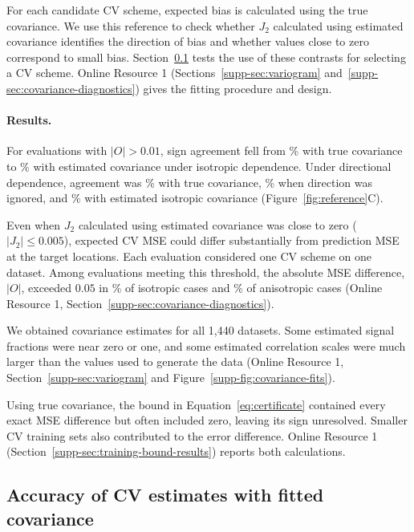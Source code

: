For each candidate CV scheme, expected bias is calculated using the true covariance. We use this reference to check whether $J_2$ calculated using estimated covariance identifies the direction of bias and whether values close to zero correspond to small bias. Section~\ref{sec:sim-refitting} tests the use of these contrasts for selecting a CV scheme. Online Resource 1 (Sections~\ref*{supp-sec:variogram} and~\ref*{supp-sec:covariance-diagnostics}) gives the fitting procedure and design.

\paragraph{Results.}
For evaluations with $|O|>0.01$, sign agreement fell from \SensIsoTrue\% with true covariance to \SensIsoEst\% with estimated covariance under isotropic dependence. Under directional dependence, agreement was \SensAnisoTrue\% with true covariance, \SensAnisoNominal\% when direction was ignored, and \SensAnisoEst\% with estimated isotropic covariance (Figure~\ref{fig:reference}C).

Even when $J_2$ calculated using estimated covariance was close to zero ($|J_2|\leq0.005$), expected CV MSE could differ substantially from prediction MSE at the target locations. Each evaluation considered one CV scheme on one dataset. Among evaluations meeting this threshold, the absolute MSE difference, $|O|$, exceeded $0.05$ in \SmallGapIso\% of isotropic cases and \SmallGapAniso\% of anisotropic cases (Online Resource 1, Section~\ref*{supp-sec:covariance-diagnostics}).

We obtained covariance estimates for all 1,440 datasets. Some estimated signal fractions were near zero or one, and some estimated correlation scales were much larger than the values used to generate the data (Online Resource 1, Section~\ref*{supp-sec:variogram} and Figure~\ref*{supp-fig:covariance-fits}).

Using true covariance, the bound in Equation~\ref{eq:certificate} contained every exact MSE difference but often included zero, leaving its sign unresolved. Smaller CV training sets also contributed to the error difference. Online Resource 1 (Section~\ref*{supp-sec:training-bound-results}) reports both calculations.

\subsection{Accuracy of CV estimates with fitted covariance}
\label{sec:sim-refitting}
